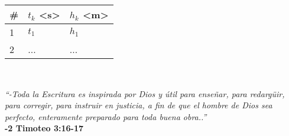 \documentclass[letter,12pt,twoside]{book} 	%
\begin{document}
\begin{center}
\centering
\begin{tabular}{ |p{ 0.5 cm}||p{2 cm}|p{2 cm}|  }
 \hline
 \# & { $t_{k}$ <s>  } & { $h_{k}$ <m>}\\
 \hline
{  1} &  {  $t_{1}$   }  &   $h_{1}$    \\
 \hline
{  2}    & ...  & ... \\
  \hline
\end{tabular}
\end{center}
\ 

 
\begin{flushright}
{\it “-Toda la Escritura es inspirada por Dios y útil para enseñar, para redargüir, para corregir, para instruir en justicia, a fin de que el hombre de Dios sea perfecto, enteramente preparado para toda buena obra..”}\\ 
{\bf  -2 Timoteo 3:16-17}
\end{flushright}
\end{document}
